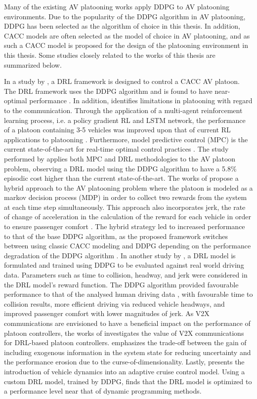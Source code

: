 Many of the existing AV platooning works apply DDPG to AV platooning environments.
Due to the popularity of the DDPG algorithm in AV platooning, DDPG has been selected
as the algorithm of choice in this thesis.
In addition, CACC models are often selected as the model of choice in AV platooning, and as such
a CACC model is proposed for the design of the platooning environment in this thesis.
Some studies closely related to the works of this thesis are summarized below.

In a study
by \cite{Lin2019},  a DRL framework is designed to control a CACC AV platoon.  The
DRL framework uses the DDPG \cite{Lillicrap2016}
algorithm and is found to have near-optimal performance \cite{Lin2019}.  In addition,
\cite{Peake2020} identifies limitations in platooning with regard to the communication.
Through the application of a multi-agent reinforcement learning process, i.e. a policy
gradient RL and LSTM network, the performance of a platoon containing 3-5 vehicles was
improved upon that of current RL applications to platooning \cite{Peake2020}. Furthermore,
model predictive control (MPC) is the current state-of-the-art for real-time optimal
control practices \cite{Lin_2021}.  The study performed by \cite{Lin_2021} applies both
MPC and DRL methodologies to the AV platoon problem, observing a DRL model using the
DDPG algorithm to have a 5.8\% episodic cost higher than the current state-of-the-art.
The works of \cite{yan2021hybrid} propose a hybrid approach to the AV platooning
problem where the platoon is modeled as a markov decision process (MDP) in order to
collect two rewards from the system at each time step simultaneously.  This approach
also incorporates jerk, the rate of change of acceleration in the calculation of the
reward for each vehicle in order to ensure passenger comfort \cite{yan2021hybrid}.  The
hybrid strategy led to increased performance to that of the base DDPG algorithm, as the
proposed framework switches between using classic CACC modeling and DDPG depending on
the performance degradation of the DDPG algorithm \cite{yan2021hybrid}. In another
study by \cite{Zhu2019}, a DRL model is formulated and trained using DDPG to be evaluated
against real world driving data. Parameters such as time to collision, headway, and jerk
were considered in the DRL model's reward function.  The DDPG algorithm provided favourable
performance to that of the analysed human driving data \cite{Zhu2019}, with favourable
time to collision results, more efficient driving via reduced vehicle headways, and
improved passenger comfort with lower magnitudes of jerk. As V2X
communications are envisioned to have a beneficial impact on the performance of platoon
controllers, the works of \cite{LeiV2x} investigates the value of V2X communications for
DRL-based platoon controllers. \cite{LeiV2x} emphasizes the trade-off between the gain of
including exogenous information in the system state for reducing uncertainty and the
performance erosion due to the curse-of-dimensionality. Lastly, \cite{Yuan2019}
presents the introduction of vehicle dynamics into an adaptive cruise control model.
Using a custom DRL model, trained by DDPG, \cite{Yuan2019} finds that the DRL model is optimized
to a performance level near that of dynamic programming methods.

